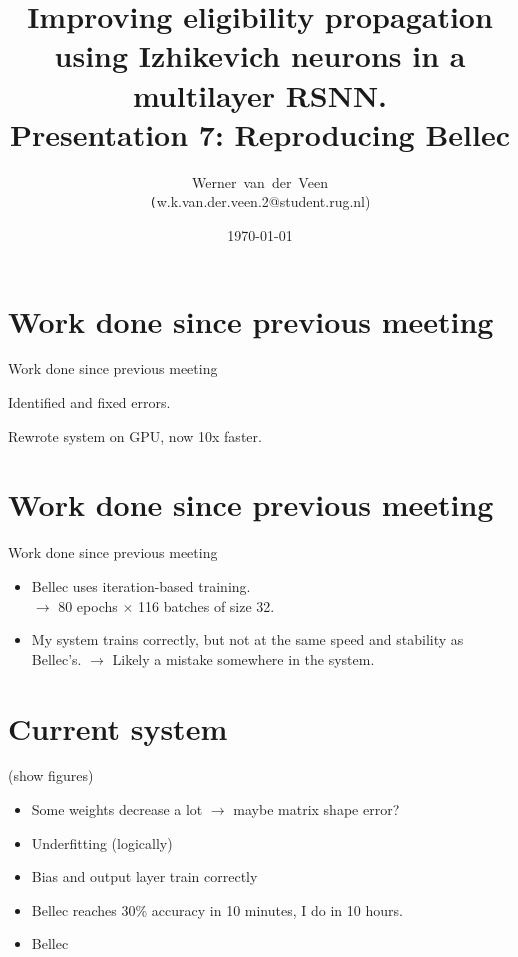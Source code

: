 \documentclass[t]{beamer}
\title[Eligibility propagation]{Improving eligibility propagation using Izhikevich neurons in a multilayer RSNN.\\\vspace{10pt}
\large{Presentation 7: Reproducing Bellec}}
\author[Werner]{Werner~van~der~Veen\\\footnotesize\texttt({w.k.van.der.veen.2@student.rug.nl})}\date{\today}
\newcommand{\cmark}{\ding{51}}%
\newcommand{\done}{\rlap{$\square$}{\raisebox{2pt}{\large\hspace{1pt}\cmark}}%
\hspace{-2.5pt}}
\begin{document}
\begin{frame}
    \titlepage
\end{frame}



\small

\section{Work done since previous meeting}
\begin{frame}{Work done since previous meeting}
  \begin{todolist}

    \item[\done] Identified and fixed errors.
    \item[\done] Rewrote system on GPU, now 10x faster.

  \end{todolist}

\end{frame}

\section{Work done since previous meeting}
\begin{frame}{Work done since previous meeting}
  \begin{itemize}[label=--]

    \item Bellec uses iteration-based training.\\
    $\rightarrow$ 80 epochs $\times$ 116 batches of size 32.
    \item My system trains correctly, but not at the same speed and stability as Bellec's.
    $\rightarrow$ Likely a mistake somewhere in the system.

  \end{itemize}

\end{frame}

\section{Current system}
\begin{frame}{}
  (show figures)
  \begin{itemize}[label=--]

    \item Some weights decrease a lot $\rightarrow$ maybe matrix shape error?
    \item Underfitting (logically)
    \item Bias and output layer train correctly
    \item Bellec reaches 30\% accuracy in 10 minutes, I do in 10 hours.
    \item Bellec

  \end{itemize}

\end{frame}
\end{document}

